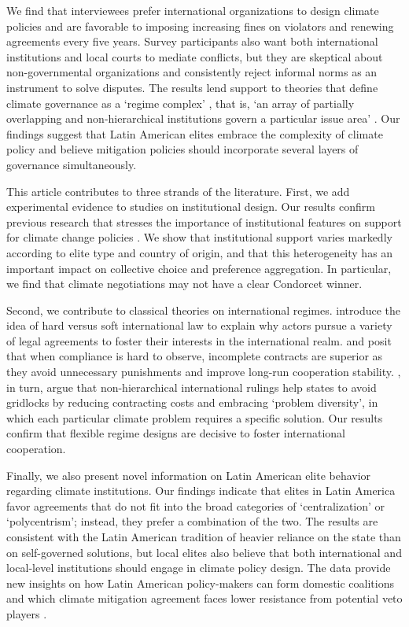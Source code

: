 \documentclass[a4paper,12pt]{article}
\begin{document}
We find that interviewees prefer international organizations to design climate policies and are favorable to imposing increasing fines on violators and renewing agreements every five years. Survey participants also want both international institutions and local courts to mediate conflicts, but they are skeptical about non-governmental organizations and consistently reject informal norms as an instrument to solve disputes. The results lend support to theories that define climate governance as a `regime complex' \citep{colgan2012punctuated,keohane2011regime}, that is, `an array of partially overlapping and non-hierarchical institutions govern a particular issue area' \citep[279]{raustiala2004regime}. Our findings suggest that Latin American elites embrace the complexity of climate policy and believe mitigation policies should incorporate several layers of governance simultaneously.

This article contributes to three strands of the literature. First, we add experimental evidence to studies on institutional design. Our results confirm previous research that stresses the importance of institutional features on support for climate change policies \citep{aklin2013understanding, bechtel2013mass, bechtel2017interests}. We show that institutional support varies markedly according to elite type and country of origin, and that this heterogeneity has an important impact on collective choice and preference aggregation. In particular, we find that climate negotiations may not have a clear Condorcet winner.

Second, we contribute to classical theories on international regimes. \citet{abbott2000hard} introduce the idea of hard versus soft international law to explain why actors pursue a variety of legal agreements to foster their interests in the international realm. \citet{mildenberger2017beliefs} and \citet{rosendorff2001optimal} posit that when compliance is hard to observe, incomplete contracts are superior as they avoid unnecessary punishments and improve long-run cooperation stability. \citet{keohane2011regime}, in turn, argue that non-hierarchical international rulings help states to avoid gridlocks by reducing contracting costs and embracing `problem diversity', in which each particular climate problem requires a specific solution. Our results confirm that flexible regime designs are decisive to foster international cooperation.

Finally, we also present novel information on Latin American elite behavior regarding climate institutions. Our findings indicate that elites in Latin America favor agreements that do not fit into the broad categories of `centralization' or `polycentrism'; instead, they prefer a combination of the two. The results are consistent with the Latin American tradition of heavier reliance on the state than on self-governed solutions, but local elites also believe that both international and local-level institutions should engage in climate policy design. The data provide new insights on how Latin American policy-makers can form domestic coalitions and which climate mitigation agreement faces lower resistance from potential veto players \citep{beiser2019commitment, hovi2019club}.
\end{document}
